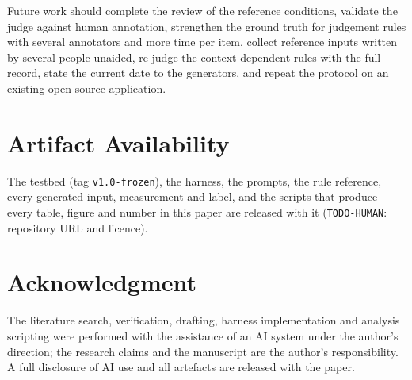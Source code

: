 \documentclass[conference]{IEEEtran}
\begin{document}
Future work should \ifreviewed\else complete the review of the reference conditions, \fi
\ifhumanlabels\else validate the judge against human annotation, \fi strengthen the ground truth for
judgement rules with several annotators and more time per item, collect reference inputs written by
several people unaided, re-judge the context-dependent rules with the full record, state the current
date to the generators, and repeat the protocol on an existing open-source application.

\section*{Artifact Availability}

The testbed (tag \texttt{v1.0-frozen}), the harness, the prompts, the rule reference, every generated
input, measurement and label, and the scripts that produce every table, figure and number in this paper
are released with it (\texttt{TODO-HUMAN}: repository URL and licence).

\section*{Acknowledgment}

The literature search, verification, drafting, harness implementation and analysis scripting were
performed with the assistance of an AI system under the author's direction; the research claims and
the manuscript are the author's responsibility. A full disclosure of AI use and all artefacts are
released with the paper.



\end{document}
